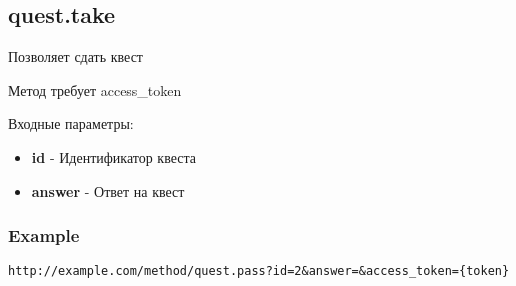 \subsection{quest.take}
Позволяет сдать квест

Метод требует access\_token

Входные параметры:
\begin{itemize}
  \item \textbf{id} - Идентификатор квеста
  \item \textbf{answer} - Ответ на квест
\end{itemize}

\subsubsection{Example}
\begin{Verbatim}[frame=single]
http://example.com/method/quest.pass?id=2&answer=&access_token={token}
\end{Verbatim}